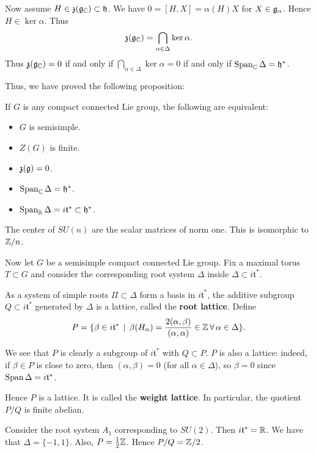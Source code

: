 \documentclass[11pt, english]{article}
\begin{document}
Now assume $H \in \mathfrak z(\mathfrak g_{\mathbb{C}}) \subset \mathfrak h$. We have $0=[H,X]=\alpha(H)X$ for $X \in \mathfrak g_\alpha$. Hence $H \in \ker \alpha$. Thus
$$
\mathfrak z(\mathfrak g_{\mathbb{C}}) = \bigcap_{\alpha \in \Delta} \ker \alpha.
$$
Thus $\mathfrak z(\mathfrak g_{\mathbb{C}}) = 0$ if and only if $\bigcap_{\alpha \in \Delta} \ker \alpha = 0$ if and only if $\operatorname{Span}_{\mathbb{C}} \Delta = \mathfrak h^\ast$.

Thus, we have proved the following proposition:

\begin{prop}
 If $G$ is any compact connected Lie group, the following are equivalent:
 \begin{itemize}
 \item $G$ is semisimple.
\item $Z(G)$ is finite.
\item $\mathfrak z(\mathfrak g) = 0$.
\item $\operatorname{Span}_{\mathbb{C}} \Delta = \mathfrak h ^\ast$.
\item $\operatorname{Span}_{\mathbb{R}} \Delta = i \mathfrak t^\ast \subset \mathfrak h^\ast$.
 \end{itemize}
\end{prop}

\begin{example}
 The center of $SU(n)$ are the scalar matrices of norm one. This is isomorphic to $\mathbb{Z}/n$. 
\end{example}

Now let $G$ be a semisimple compact connected Lie group. Fix a maximal torus $T \subset G$ and consider the corresponding root system $\Delta$ inside $\Delta \subset i \mathfrak t^\ast$.

As a system of simple roots $\Pi \subset \Delta$ form a basis in $i \mathfrak t^\ast$, the additive subgroup $Q \subset i \mathfrak t^\ast$ generated by $\Delta$ is a lattice, called the \textbf{root lattice}. Define
$$
P = \{ \beta \in i \mathfrak t^\ast \, \mid \, \beta(H_\alpha)=\frac{2(\alpha,\beta)}{(\alpha,\alpha)} \in \mathbb{Z} \, \forall \, \alpha \in \Delta\}.
$$

We see that $P$ is clearly a subgroup of $i \mathfrak t^\ast$ with $Q \subset P$. $P$ is also a lattice: indeed, if $\beta \in P$ is close to zero, then $(\alpha,\beta)=0$ (for all $\alpha \in \Delta$), so $\beta=0$ since $\operatorname{Span} \Delta = i \mathfrak t ^\ast$.

Hence $P$ is a lattice. It is called the \textbf{weight lattice}. In particular, the quotient $P/Q$ is finite abelian.

\begin{example}
Consider the root system $A_1$ corresponding to $SU(2)$. Then $i \mathfrak t^\ast = \mathbb{R}$. We have that $\Delta= \{ -1, 1\}$. Also, $P= \frac 12 \mathbb{Z}$. Hence $P/Q = \mathbb{Z}/2$. 
\end{example}
\end{document}
